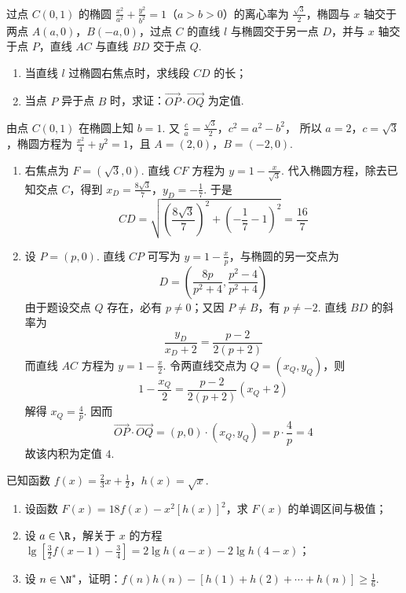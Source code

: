 \begin{problem}
过点 \(C(0, 1)\) 的椭圆 \(\frac{x^2}{a^2} + \frac{y^2}{b^2} = 1\)（\(a > b > 0\)）的离心率为 \(\frac{\sqrt{3}}{2}\)，椭圆与 \(x\) 轴交于两点 \(A(a, 0)\)，\(B(-a, 0)\)，过点 \(C\) 的直线 \(l\) 与椭圆交于另一点 \(D\)，并与 \(x\) 轴交于点 \(P\)，直线 \(AC\) 与直线 \(BD\) 交于点 \(Q\).
\begin{enumerate}
\item 当直线 \(l\) 过椭圆右焦点时，求线段 \(CD\) 的长；
\item 当点 \(P\) 异于点 \(B\) 时，求证：\(\overrightarrow{OP} \cdot \overrightarrow{OQ}\) 为定值.
\end{enumerate}
\end{problem}

\begin{solution}
由点 \(C(0,1)\) 在椭圆上知 \(b=1\). 又
\(\frac ca=\frac{\sqrt3}{2}\)，\(c^2=a^2-b^2\)，
所以 \(a=2\)，\(c=\sqrt3\)，椭圆方程为 \(\frac{x^2}{4}+y^2=1\)，且 \(A=(2,0)\)，\(B=(-2,0)\).
\begin{enumerate}
\item 右焦点为 \(F=(\sqrt3,0)\). 直线 \(CF\) 方程为 \(y=1-\frac{x}{\sqrt3}\). 代入椭圆方程，除去已知交点 \(C\)，得到
\(x_D=\frac{8\sqrt3}{7}\)，\(y_D=-\frac17\).
于是
\[
CD=\sqrt{\left(\frac{8\sqrt3}{7}\right)^2+\left(-\frac17-1\right)^2}=\frac{16}{7}
\]
\item 设 \(P=(p,0)\). 直线 \(CP\) 可写为 \(y=1-\frac{x}{p}\)，与椭圆的另一交点为
\[
D=\left(\frac{8p}{p^2+4},\frac{p^2-4}{p^2+4}\right)
\]
由于题设交点 \(Q\) 存在，必有 \(p\ne0\)；又因 \(P\ne B\)，有 \(p\ne-2\). 直线 \(BD\) 的斜率为
\[
\frac{y_D}{x_D+2}=\frac{p-2}{2(p+2)}
\]
而直线 \(AC\) 方程为 \(y=1-\frac{x}{2}\). 令两直线交点为 \(Q=(x_Q,y_Q)\)，则
\[
1-\frac{x_Q}{2}=\frac{p-2}{2(p+2)}(x_Q+2)
\]
解得 \(x_Q=\frac4p\). 因而
\[
\overrightarrow{OP}\cdot\overrightarrow{OQ}=(p,0)\cdot(x_Q,y_Q)=p\cdot\frac4p=4
\]
故该内积为定值 \(4\).
\end{enumerate}
\end{solution}

\begin{problem}
已知函数 \(f(x) = \frac{2}{3}x + \frac{1}{2}\)，\(h(x) = \sqrt{x}\).
\begin{enumerate}
\item 设函数 \(F(x) = 18f(x) - x^2[h(x)]^2\)，求 \(F(x)\) 的单调区间与极值；
\item 设 \(a \in \R\)，解关于 \(x\) 的方程 \(\lg \left[ \frac{3}{2}f(x - 1) - \frac{3}{4} \right] = 2\lg h(a - x) - 2\lg h(4 - x)\)；
\item 设 \(n \in \N^{*}\)，证明：\(f(n)h(n) - [h(1) + h(2) + \cdots + h(n)] \geqslant \frac{1}{6}\).
\end{enumerate}
\end{problem}

